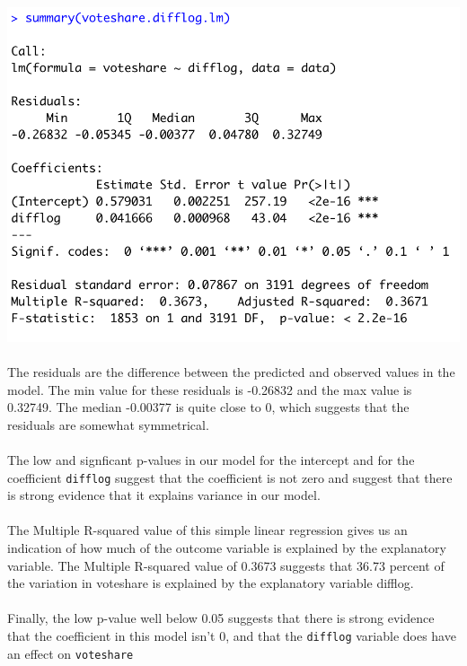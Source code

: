 \documentclass[12pt,letterpaper]{article}
\begin{document}
\begin{enumerate}
\includegraphics{PS3 Q1 Regression.png}
\\\\
\noindent The residuals are the difference between the predicted and observed values in the model. The min value for these residuals is -0.26832 and the max value is 0.32749. The median -0.00377 is quite close to 0, which suggests that the residuals are somewhat symmetrical. 
\\\\
\noindent The low and signficant p-values in our model for the intercept and for the coefficient \texttt{difflog} suggest that the coefficient is not zero and suggest that there is strong evidence that it explains variance in our model.
\\\\
\noindent The Multiple R-squared value of this simple linear regression gives us an indication of how much of the outcome variable is explained by the explanatory variable. The Multiple R-squared value of 0.3673 suggests that 36.73 percent of the variation in voteshare is explained by the explanatory variable difflog.
\\\\
\noindent Finally, the low p-value well below 0.05 suggests that there is strong evidence that the coefficient in this model isn't 0, and that the \texttt{difflog} variable does have an effect on \texttt{voteshare}

\newpage



\end{enumerate}
\end{document}
